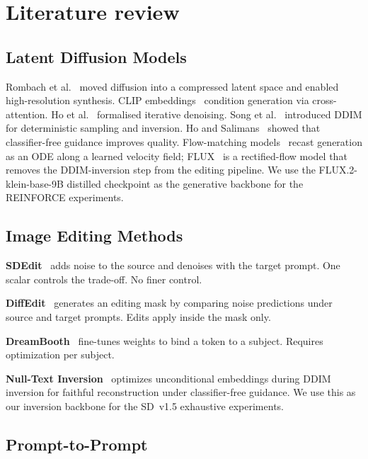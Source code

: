 \chapter{Literature review}

\section{Latent Diffusion Models}

Rombach et al.~\cite{rombach2022high} moved diffusion into a compressed latent space and enabled high-resolution synthesis. CLIP embeddings~\cite{radford2021learning} condition generation via cross-attention. Ho et al.~\cite{ho2020denoising} formalised iterative denoising. Song et al.~\cite{song2020denoising} introduced DDIM for deterministic sampling and inversion. Ho and Salimans~\cite{ho2022classifier} showed that classifier-free guidance improves quality. Flow-matching models~\cite{lipman2023flow} recast generation as an ODE along a learned velocity field; FLUX~\cite{flux2024} is a rectified-flow model that removes the DDIM-inversion step from the editing pipeline. We use the FLUX.2-klein-base-9B distilled checkpoint as the generative backbone for the REINFORCE experiments.

\section{Image Editing Methods}

\textbf{SDEdit}~\cite{meng2021sdedit} adds noise to the source and denoises with the target prompt. One scalar controls the trade-off. No finer control.

\textbf{DiffEdit}~\cite{couairon2022diffedit} generates an editing mask by comparing noise predictions under source and target prompts. Edits apply inside the mask only.

\textbf{DreamBooth}~\cite{ruiz2023dreambooth} fine-tunes weights to bind a token to a subject. Requires optimization per subject.

\textbf{Null-Text Inversion}~\cite{mokady2023null} optimizes unconditional embeddings during DDIM inversion for faithful reconstruction under classifier-free guidance. We use this as our inversion backbone for the SD~v1.5 exhaustive experiments.

\section{Prompt-to-Prompt}
\label{sec:p2p}

